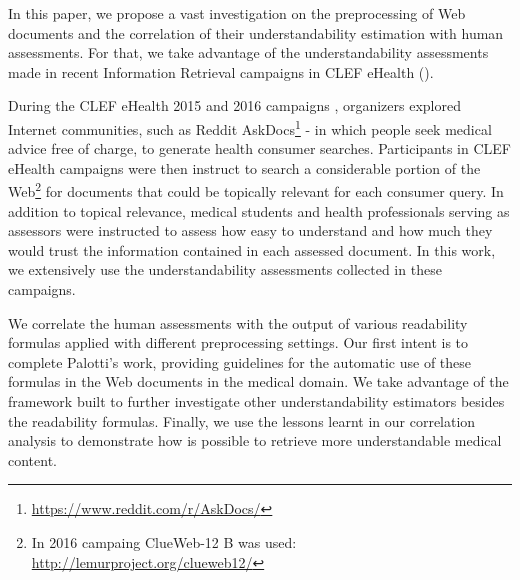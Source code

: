 In this paper, we propose a vast investigation on the preprocessing of Web documents and the correlation of their understandability estimation with human assessments.
For that, we take advantage of the understandability assessments made in recent Information Retrieval campaigns in CLEF eHealth (\cite{clef15,clef16}).

During the CLEF eHealth 2015 and 2016 campaigns \cite{clef15,clef16}, organizers explored Internet communities, such as Reddit AskDocs\footnote{\url{https://www.reddit.com/r/AskDocs/}} - in which people seek medical advice free of charge, to generate health consumer searches. Participants in CLEF eHealth campaigns were then instruct to search a considerable portion of the Web\footnote{In 2016 campaing ClueWeb-12 B was used: \url{http://lemurproject.org/clueweb12/}} for documents that could be topically relevant for each consumer query.
In addition to topical relevance, medical students and health professionals serving as assessors were instructed to assess how easy to understand and how much they would trust the information contained in each assessed document. %
%
In this work, we extensively use the understandability assessments collected in these campaigns.


We correlate the human assessments with the output of various readability formulas applied with different preprocessing settings.
Our first intent is to complete Palotti's work, providing guidelines for the automatic use of these formulas in the Web documents in the medical domain.
We take advantage of the framework built to further investigate other understandability estimators besides the readability formulas.
Finally, we use the lessons learnt in our correlation analysis to demonstrate how is possible to retrieve more understandable medical content. 

